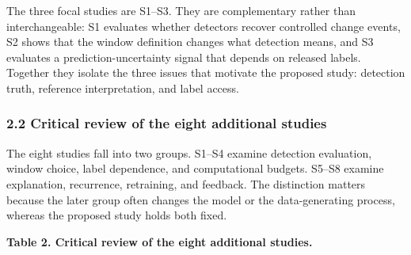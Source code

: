 \documentclass[
]{article}
\begin{document}
The three focal studies are S1--S3. They are complementary rather than
interchangeable: S1 evaluates whether detectors recover controlled
change events, S2 shows that the window definition changes what
detection means, and S3 evaluates a prediction-uncertainty signal that
depends on released labels. Together they isolate the three issues that
motivate the proposed study: detection truth, reference interpretation,
and label access.

\hypertarget{critical-review-of-the-eight-additional-studies}{%
\subsubsection{2.2 Critical review of the eight additional
studies}\label{critical-review-of-the-eight-additional-studies}}

The eight studies fall into two groups. S1--S4 examine detection
evaluation, window choice, label dependence, and computational budgets.
S5--S8 examine explanation, recurrence, retraining, and feedback. The
distinction matters because the later group often changes the model or
the data-generating process, whereas the proposed study holds both
fixed.

\textbf{Table 2. Critical review of the eight additional studies.}
\end{document}
